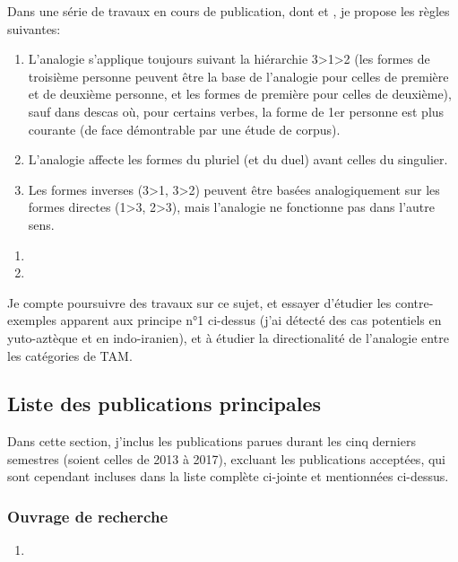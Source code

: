 \documentclass[oldfontcommands,oneside,a4paper,11pt]{article}
\begin{document}
Dans une série de travaux en cours de publication, dont \citet{jacques18directionality} et \citet{jacques16ebde}, je propose les règles suivantes:

\begin{enumerate}
\item L'analogie s'applique toujours suivant la hiérarchie 3>1>2 (les formes de troisième personne peuvent être la base de l'analogie pour celles de première et de deuxième personne, et les formes de première pour celles de deuxième), sauf dans descas où, pour certains verbes, la forme de 1er personne est plus courante (de face démontrable par une étude de corpus).
\item L'analogie affecte les formes du pluriel (et du duel) avant celles du singulier.
\item Les formes inverses (3>1, 3>2) peuvent être basées analogiquement sur les formes directes (1>3, 2>3), mais l'analogie ne fonctionne pas dans l'autre sens.
\end{enumerate}

\begin{enumerate}
 \item  {}
 \item {}
\end{enumerate}

Je compte poursuivre des travaux sur ce sujet, et essayer d'étudier les contre-exemples apparent aux principe n°1 ci-dessus (j'ai détecté des cas potentiels en yuto-aztèque et en indo-iranien), et à étudier la directionalité de l'analogie entre les catégories de TAM.

\subsection{Liste des publications principales}
Dans cette section, j'inclus les publications parues durant les cinq derniers semestres (soient celles de 2013 à 2017), excluant les publications acceptées, qui sont cependant incluses dans la liste complète ci-jointe et mentionnées ci-dessus.
%



\subsubsection{Ouvrage de recherche}
\begin{enumerate}
 \item  {}     
\end{enumerate}
\end{document}
